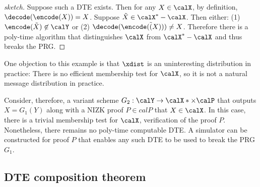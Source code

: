 \begin{proof}[sketch]
Suppose such a DTE exists. Then for any $X \in \calX$, by definition, $\decode(\encode(X)) = X$. Suppose $\tilde{X} \in \calX^* - \calX$. Then either: (1) $\encode(\tilde{X}) \not \in \calY$ or (2) $\decode(\encode(\tilde(X))) \neq X$. Therefore there is a poly-time algorithm that distinguishes $\calX$ from $\calX^* - \calX$ and thus breaks the PRG.
\end{proof}

One objection to this example is that $\xdist$ is an uninteresting distribution in practice: There is no efficient membership test for $\calX$, so it is not a natural message distribution in practice. 

Consider, therefore, a variant scheme $G_2: \calY \rightarrow \calX* \times \calP$ that outputs $X = G_1(Y)$ along with a NIZK proof $P \in calP$ that $X \in \calX$. In this case, there is a trivial membership test for $\calX$, verification of the proof $P$. Nonetheless, there remains no poly-time computable DTE. A simulator can be constructed for proof $P$ that enables any such DTE to be used to break the PRG $G_1$.

\subsection{DTE composition theorem}





